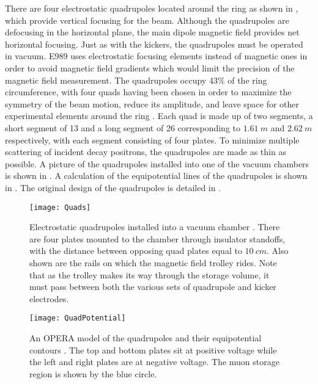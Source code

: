 There are four electrostatic quadrupoles located around the ring as shown in , which provide vertical focusing for the beam. Although the quadrupoles are defocusing in the horizontal plane, the main dipole magnetic field provides net horizontal focusing. Just as with the kickers, the quadrupoles must be operated in vacuum. E989 uses electrostatic focusing elements instead of magnetic ones in order to avoid magnetic field gradients which would limit the precision of the magnetic field measurement. The quadrupoles occupy 43\% of the ring circumference, with four quads having been chosen in order to maximize the symmetry of the beam motion, reduce its amplitude, and leave space for other experimental elements around the ring \cite{TDR}. Each quad is made up of two segments, a short segment of 13\textdegree{} and a long segment of 26\textdegree{} corresponding to $\SI{1.61}{m}$ and $\SI{2.62}{m}$ respectively, with each segment consisting of four plates. To minimize multiple scattering of incident decay positrons, the quadrupoles are made as thin as possible. A picture of the quadrupoles installed into one of the vacuum chambers is shown in . A calculation of the equipotential lines of the quadrupoles is shown in . The original design of the quadrupoles is detailed in .

\begin{figure}
    \centering
    \texttt{[image: Quads]}
    \caption[Electrostatic quadrupoles installed in a vacuum chamber]{Electrostatic quadrupoles installed into a vacuum chamber \cite{QuadsE821}. There are four plates mounted to the chamber through insulator standoffs, with the distance between opposing quad plates equal to $\SI{10}{cm}$. Also shown are the rails on which the magnetic field trolley rides. Note that as the trolley makes its way through the storage volume, it must pass between both the various sets of quadrupole and kicker electrodes.}
    \label{fig:Quads}
\end{figure}

\begin{figure}
    \centering
    \texttt{[image: QuadPotential]}
    \caption[Electrostatic quadrupole potentials]{An OPERA model of the quadrupoles and their equipotential contours \cite{TDR}. The top and bottom plates sit at positive voltage while the left and right plates are at negative voltage. The muon storage region is shown by the blue circle.}   
    \label{fig:QuadPotential}
\end{figure}


